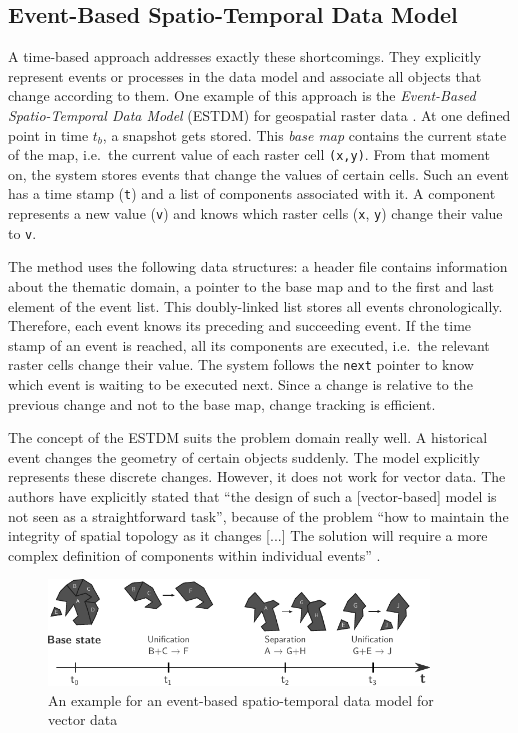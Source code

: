 \subsection{Event-Based Spatio-Temporal Data Model} %
\label{sub:event_based_spatio_temporal_data_model}

A time-based approach addresses exactly these shortcomings. They explicitly represent events or processes in the data model and associate all objects that change according to them. One example of this approach is the \emph{Event-Based Spatio-Temporal Data Model} (ESTDM) for geospatial raster data \cite{peuquet95}.
At one defined point in time $t_b$, a snapshot gets stored. This \emph{base map} contains the current state of the map, i.e.\ the current value of each raster cell \texttt{(x,y)}. From that moment on, the system stores events that change the values of certain cells. Such an event has a time stamp (\texttt{t}) and a list of components associated with it. A component represents a new value (\texttt{v}) and knows which raster cells (\texttt{x}, \texttt{y}) change their value to \texttt{v}.

The method uses the following data structures: a header file contains information about the thematic domain, a pointer to the base map and to the first and last element of the event list. This doubly-linked list stores all events chronologically. Therefore, each event knows its preceding and succeeding event. If the time stamp of an event is reached, all its components are executed, i.e.\ the relevant raster cells change their value. The system follows the \texttt{next} pointer to know which event is waiting to be executed next. Since a change is relative to the previous change and not to the base map, change tracking is efficient.

The concept of the ESTDM suits the problem domain really well. A historical event changes the geometry of certain objects suddenly. The model explicitly represents these discrete changes. However, it does not work for vector data. The authors have explicitly stated that ``the design of such a [vector-based] model is not seen as a straightforward task'', because of the problem ``how to maintain the integrity of spatial topology as it changes [...] The solution will require a more complex definition of components within individual events''
\cite[p. 21]{peuquet95}.

\begin{figure}[H]
  \vspace{1em}
  \centering
  \includegraphics[width=0.9\textwidth]{graphics/basics/stdm/event-based_spatio-temporal_data_model}
  \caption{An example for an event-based spatio-temporal data model for vector data}
  \label{fig:event-based_spatio-temporal_data_model}
\end{figure}

